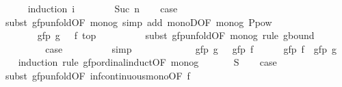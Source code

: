 \begin{isabellebody}
\ \ \ \ \isamarkupfalse%
\ {\isacharparenleft}induction\ i{\isacharparenright}\isanewline
\ \ \ \ \ \ \isamarkupfalse%
\ {\isacharparenleft}Suc\ n{\isacharparenright}\ \isamarkupfalse%
\ \isamarkupfalse%
\ {\isacharquery}case\isanewline
\ \ \ \ \ \ \ \ \isamarkupfalse%
\ {\isacharparenleft}subst\ gfp{\isacharunderscore}unfold{\isacharbrackleft}OF\ mono{\isacharunderscore}g{\isacharbrackright}{\isacharparenright}\ {\isacharparenleft}simp\ add{\isacharcolon}\ monoD{\isacharbrackleft}OF\ mono{\isacharunderscore}g{\isacharbrackright}\ P{\isacharunderscore}pow{\isacharparenright}\isanewline
\ \ \ \ \isamarkupfalse%
\isanewline
\ \ \ \ \ \ \isamarkupfalse%
\ {}\isanewline
\ \ \ \ \ \ \isamarkupfalse%
\ {\isachardoublequoteopen}gfp\ g\ {\isasymle}\ {\isasymalpha}\ {\isacharparenleft}f\ top{\isacharparenright}{\isachardoublequoteclose}\isanewline
\ \ \ \ \ \ \ \ \isamarkupfalse%
\ {\isacharparenleft}subst\ gfp{\isacharunderscore}unfold{\isacharbrackleft}OF\ mono{\isacharunderscore}g{\isacharbrackright}{\isacharparenright}\ {\isacharparenleft}rule\ g{\isacharunderscore}bound{\isacharparenright}\isanewline
\ \ \ \ \ \ \isamarkupfalse%
\ \isamarkupfalse%
\ {\isacharquery}case\isanewline
\ \ \ \ \ \ \ \ \isamarkupfalse%
\ simp\isanewline
\ \ \ \ \isamarkupfalse%
\isanewline
\ \ \isamarkupfalse%
\isanewline
\ \ \isamarkupfalse%
\ \isamarkupfalse%
\ {\isachardoublequoteopen}gfp\ g\ {\isasymle}\ {\isasymalpha}\ {\isacharparenleft}gfp\ f{\isacharparenright}{\isachardoublequoteclose}\ \isacommand{{\isachardot}}\isamarkupfalse%
\isanewline
\isanewline
\ \ \isamarkupfalse%
\ {\isachardoublequoteopen}{\isasymalpha}\ {\isacharparenleft}gfp\ f{\isacharparenright}\ {\isasymle}\ gfp\ g{\isachardoublequoteclose}\isanewline
\ \ \isamarkupfalse%
\ {\isacharparenleft}induction\ rule{\isacharcolon}\ gfp{\isacharunderscore}ordinal{\isacharunderscore}induct{\isacharbrackleft}OF\ mono{\isacharunderscore}g{\isacharbrackright}{\isacharparenright}\isanewline
\ \ \ \ \isamarkupfalse%
\ {\isacharparenleft}{}\ S{\isacharparenright}\ \isamarkupfalse%
\ \isamarkupfalse%
\ {\isacharquery}case\isanewline
\ \ \ \ \ \ \isamarkupfalse%
\ {\isacharparenleft}subst\ gfp{\isacharunderscore}unfold{\isacharbrackleft}OF\ inf{\isacharunderscore}continuous{\isacharunderscore}mono{\isacharbrackleft}OF\ f{\isacharbrackright}{\isacharbrackright}{\isacharparenright}\isanewline

\end{isabellebody}
